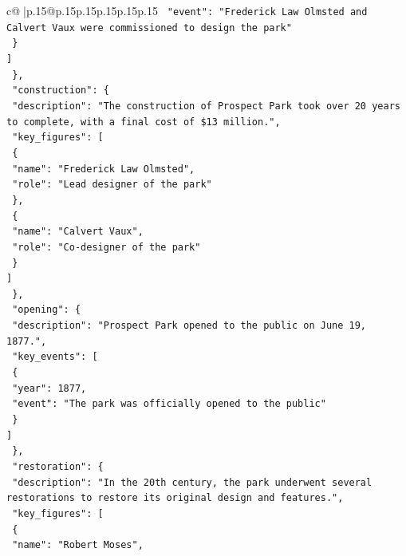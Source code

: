 \documentclass{article}
\begin{document}
{\begin{supertabular}{c@{$\;$}|p{.15\linewidth}@{}p{.15\linewidth}p{.15\linewidth}p{.15\linewidth}p{.15\linewidth}p{.15\linewidth}}
{{{\texttt{          "event": "Frederick Law Olmsted and Calvert Vaux were commissioned to design the park"} \\
\texttt{        \}} \\
\texttt{      {]}} \\
\texttt{    \},} \\
\texttt{    "construction": \{} \\
\texttt{      "description": "The construction of Prospect Park took over 20 years to complete, with a final cost of \$13 million.",} \\
\texttt{      "key\_figures": {[}} \\
\texttt{        \{} \\
\texttt{          "name": "Frederick Law Olmsted",} \\
\texttt{          "role": "Lead designer of the park"} \\
\texttt{        \},} \\
\texttt{        \{} \\
\texttt{          "name": "Calvert Vaux",} \\
\texttt{          "role": "Co{-}designer of the park"} \\
\texttt{        \}} \\
\texttt{      {]}} \\
\texttt{    \},} \\
\texttt{    "opening": \{} \\
\texttt{      "description": "Prospect Park opened to the public on June 19, 1877.",} \\
\texttt{      "key\_events": {[}} \\
\texttt{        \{} \\
\texttt{          "year": 1877,} \\
\texttt{          "event": "The park was officially opened to the public"} \\
\texttt{        \}} \\
\texttt{      {]}} \\
\texttt{    \},} \\
\texttt{    "restoration": \{} \\
\texttt{      "description": "In the 20th century, the park underwent several restorations to restore its original design and features.",} \\
\texttt{      "key\_figures": {[}} \\
\texttt{        \{} \\
\texttt{          "name": "Robert Moses",} \\
}}}
\end{supertabular}}
\end{document}
